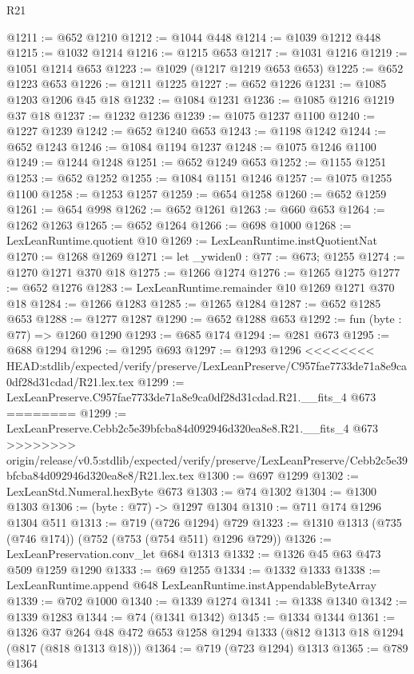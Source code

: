 \begin{lexlean}{R21}
\begin{coremodule}
{{{{{{{{{{{{{{{@1211 := @652 @1210
@1212 := @1044 @448
@1214 := @1039 @1212 @448
@1215 := @1032 @1214
@1216 := @1215 @653
@1217 := @1031 @1216
@1219 := @1051 @1214 @653
@1223 := @1029 (@1217 @1219 @653 @653)
@1225 := @652 @1223 @653
@1226 := @1211 @1225
@1227 := @652 @1226
@1231 := @1085 @1203 @1206 @45 @18
@1232 := @1084 @1231
@1236 := @1085 @1216 @1219 @37 @18
@1237 := @1232 @1236
@1239 := @1075 @1237 @1100
@1240 := @1227 @1239
@1242 := @652 @1240 @653
@1243 := @1198 @1242
@1244 := @652 @1243
@1246 := @1084 @1194 @1237
@1248 := @1075 @1246 @1100
@1249 := @1244 @1248
@1251 := @652 @1249 @653
@1252 := @1155 @1251
@1253 := @652 @1252
@1255 := @1084 @1151 @1246
@1257 := @1075 @1255 @1100
@1258 := @1253 @1257
@1259 := @654 @1258
@1260 := @652 @1259
@1261 := @654 @998
@1262 := @652 @1261
@1263 := @660 @653
@1264 := @1262 @1263
@1265 := @652 @1264
@1266 := @698 @1000
@1268 := LexLeanRuntime.quotient @10
@1269 := LexLeanRuntime.instQuotientNat
@1270 := @1268 @1269
@1271 := let _ywiden0 : @77 := @673; @1255
@1274 := @1270 @1271 @370 @18
@1275 := @1266 @1274
@1276 := @1265 @1275
@1277 := @652 @1276
@1283 := LexLeanRuntime.remainder @10 @1269 @1271 @370 @18
@1284 := @1266 @1283
@1285 := @1265 @1284
@1287 := @652 @1285 @653
@1288 := @1277 @1287
@1290 := @652 @1288 @653
@1292 := fun (byte : @77) => @1260 @1290
@1293 := @685 @174
@1294 := @281 @673
@1295 := @688 @1294
@1296 := @1295 @693
@1297 := @1293 @1296
<<<<<<<< HEAD:stdlib/expected/verify/preserve/LexLeanPreserve/C957fae7733de71a8e9ca0df28d31cdad/R21.lex.tex
@1299 := LexLeanPreserve.C957fae7733de71a8e9ca0df28d31cdad.R21.__fits_4 @673
========
@1299 := LexLeanPreserve.Cebb2c5e39bfcba84d092946d320ea8e8.R21.__fits_4 @673
>>>>>>>> origin/release/v0.5:stdlib/expected/verify/preserve/LexLeanPreserve/Cebb2c5e39bfcba84d092946d320ea8e8/R21.lex.tex
@1300 := @697 @1299
@1302 := LexLeanStd.Numeral.hexByte @673
@1303 := @74 @1302
@1304 := @1300 @1303
@1306 := (byte : @77) -> @1297 @1304
@1310 := @711 @174 @1296 @1304 @511
@1313 := @719 (@726 @1294) @729
@1323 := @1310 @1313 (@735 (@746 @174)) (@752 (@753 (@754 @511) @1296 @729))
@1326 := LexLeanPreservation.conv_let @684 @1313
@1332 := @1326 @45 @63 @473 @509 @1259 @1290
@1333 := @69 @1255
@1334 := @1332 @1333
@1338 := LexLeanRuntime.append @648 LexLeanRuntime.instAppendableByteArray
@1339 := @702 @1000
@1340 := @1339 @1274
@1341 := @1338 @1340
@1342 := @1339 @1283
@1344 := @74 (@1341 @1342)
@1345 := @1334 @1344
@1361 := @1326
    @37
    @264
    @48
    @472
    @653
    @1258
    @1294
    @1333
    (@812 @1313 @18 @1294 (@817 (@818 @1313 @18)))
@1364 := @719 (@723 @1294) @1313
@1365 := @789 @1364
}}}}}}}}}}}}}}}
\end{coremodule}
\end{lexlean}
